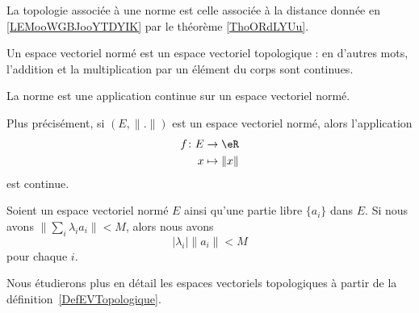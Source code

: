 \begin{definition}      \label{DEFooPMVFooPSYVNQ}
	La topologie associée à une norme est celle associée à la distance donnée en \ref{LEMooWGBJooYTDYIK} par le théorème \ref{ThoORdLYUu}.
\end{definition}

\begin{corollary}       \label{CORooMWCUooKyoyZV}
	Un espace vectoriel normé est un espace vectoriel topologique : en d'autres mots, l'addition et la multiplication par un élément du corps sont continues.
\end{corollary}

\begin{proposition}     \label{PROPooYMCUooERvDpk}
	La norme est une application continue sur un espace vectoriel normé.

	Plus précisément, si \( (E,\| . \|)\) est un espace vectoriel normé, alors l'application
	\begin{equation}
		\begin{aligned}
			f\colon E & \to \eR         \\
			x         & \mapsto \| x \|
		\end{aligned}
	\end{equation}
	est continue.
\end{proposition}

\begin{lemma}        \label{LEMooGCJEooOAynZW}
	Soient un espace vectoriel normé \( E\) ainsi qu'une partie libre \( \{ a_i \}\) dans \( E\). Si nous avons \( \| \sum_i\lambda_ia_i \|<M\), alors nous avons
	\begin{equation}
		| \lambda_i |\| a_i \|<M
	\end{equation}
	pour chaque \( i\).
\end{lemma}

Nous étudierons plus en détail les espaces vectoriels topologiques à partir de la définition~\ref{DefEVTopologique}.

